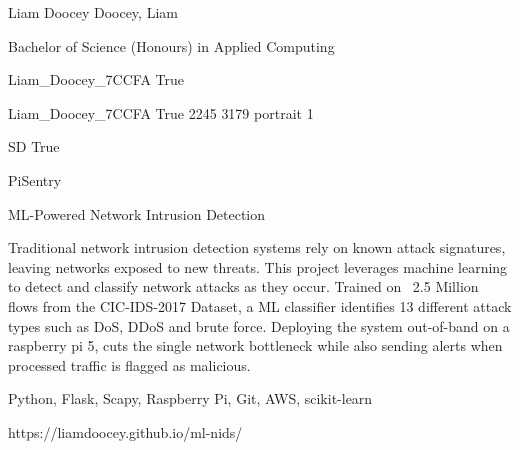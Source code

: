 
\begingroup{}\relax



\def\Key{Liam_Doocey_7CCFA}

{Liam Doocey}
{Doocey, Liam}

{Bachelor of Science (Honours) in Applied Computing}

{Liam_Doocey_7CCFA}
{True}

{Liam_Doocey_7CCFA}
{True}
{2245}
{3179}
{portrait}
{1}

{SD}
{True}

{PiSentry}

{ML-Powered Network Intrusion Detection}

{Traditional network intrusion detection systems rely on known attack signatures, leaving networks exposed to new threats. This project leverages machine learning to detect and classify network attacks as they occur. Trained on ~2.5 Million flows from the CIC-IDS-2017 Dataset, a ML classifier identifies 13 different attack types such as DoS, DDoS and brute force. Deploying the system out-of-band on a raspberry pi 5, cuts the single network bottleneck while also sending alerts when processed traffic is flagged as malicious.}

{Python, Flask, Scapy, Raspberry Pi, Git, AWS, scikit-learn}

{https://liamdoocey.github.io/ml-nids/}

